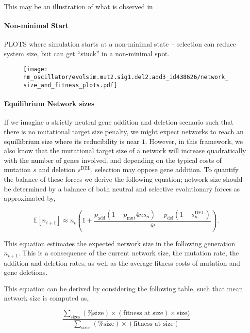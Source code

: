 \documentclass{article}
\newcommand{\1}{\mathbbm{1}}
\begin{document}
This may be an illustration of what is observed in \citet{smith2015mitochondrial}.

\paragraph{Non-minimal Start}

PLOTS where simulation starts at a non-minimal state -- selection can reduce system size, but can get ``stuck'' in a non-minimal spot.
\begin{figure}[H]
\texttt{[image: nm\_oscillator/evolsim.mut2.sig1.del2.add3\_id438626/network\_size\_and\_fitness\_plots.pdf]}
\end{figure}

\paragraph{Equilibrium Network sizes}

If we imagine a strictly neutral gene addition and deletion scenario such that there is no mutational target size penalty,
we might expect networks to reach an equillibrium size where its reducibility is near $1$. However, in this framework,
we also know that the mutational target size of a network will increase quadratically with the number of genes involved,
and depending on the typical costs of mutation $s$ and deletion $s^{\text{DEL}}$, selection may oppose gene addition. To quantify
the balance of these forces we derive the following equation; network size should be determined by a balance of both neutral
and selective evolutionary forces as approximated by,

\begin{equation}
\mathbb{E} \left[ n_{t+1} \right] \approx n_t \left( 1 + \frac{p_{\text{add}} \left(1 - p_{\text{mut}}4ns_n\right) - p_{\text{del}} \left(1 - s^{\text{DEL}}_{n}\right)}{\bar{w}} \right) .
\end{equation}

This equation estimates the expected network size in the following generation $n_{t+1}$. This is a consequence of the current network size,
the mutation rate, the addition and deletion rates, as well as the average fitness costs of mutation and gene deletions. 

This equation can be derived by considering the following table, such that mean network size is computed as,

\begin{equation}
\frac{\sum_{\text{sizes}} (\% \text{size}) \times (\text{fitness at size}) \times \text{size})}{\sum_{\text{sizes}} (\% \text{size}) \times (\text{fitness at size})}
\end{equation}
\end{document}
